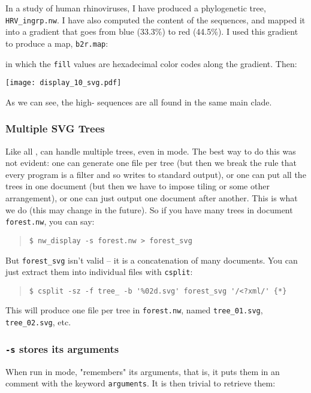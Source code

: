 In a study of human rhinoviruses, I have produced a phylogenetic tree,
\texttt{HRV\_ingrp.nw}. I have also computed the \gc{} content of the sequences,
and mapped it into a gradient that goes from {\color{Blue} blue} (33.3\%) to
{\color{Red} red} (44.5\%). I used this gradient to produce a \css{} map,
\texttt{b2r.map}:




\noindent{}in which the \texttt{fill} values are hexadecimal color codes along
the gradient. Then:


\texttt{[image: display\_10\_svg.pdf]}
\bigskip{}

\noindent{}As we can see, the high-\gc{} sequences are all found in the same
main clade.

\subsubsection{Multiple SVG Trees}

Like all \nutils, \display{} can handle multiple trees, even in \svg{} mode.
The best way to do this was not evident: one can generate one file per tree (but
then we break the rule that every program is a filter and so writes to standard
output), or one can put all the trees in one \svg{} document (but then we have
to impose tiling or some other arrangement), or one can just output one \svg{}
document after another. This is what we do (this may change in the future). So
if you have many trees in document \texttt{forest.nw}, you can say:
\begin{quote}
\verb+$ nw_display -s forest.nw > forest_svg+
\end{quote}
But \texttt{forest\_svg} isn't valid \svg{} -- it is a concatenation of many \svg{} documents. You can just extract them into individual files with \texttt{csplit}:
\begin{quote}
\verb+$ csplit -sz -f tree_ -b '%02d.svg' forest_svg '/<?xml/' {*}+
\end{quote}
This will produce one \svg{} file per tree in \texttt{forest.nw}, named \texttt{tree\_01.svg}, \texttt{tree\_02.svg}, etc.

\subsubsection{\display{} \texttt{-s} stores its arguments}

When run in \svg{} mode, \display{} "remembers" its arguments, that is, it puts
them in an \xml{} comment with the keyword \texttt{arguments}. It is then
trivial to retrieve them:

